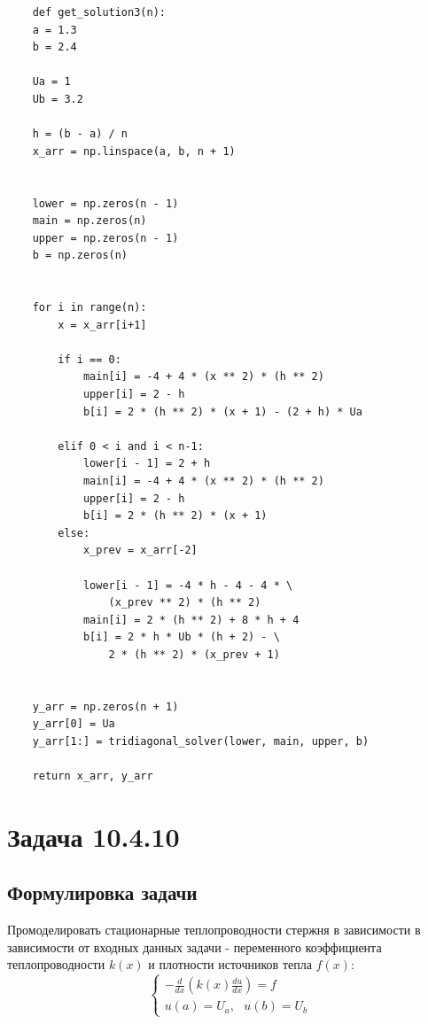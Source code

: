 \documentclass[12pt]{article}%
\begin{document}
\begin{verbatim}
    def get_solution3(n):
    a = 1.3
    b = 2.4

    Ua = 1
    Ub = 3.2

    h = (b - a) / n
    x_arr = np.linspace(a, b, n + 1)


    lower = np.zeros(n - 1)
    main = np.zeros(n)
    upper = np.zeros(n - 1)
    b = np.zeros(n)

    
    for i in range(n):
        x = x_arr[i+1]
    
        if i == 0:
            main[i] = -4 + 4 * (x ** 2) * (h ** 2)
            upper[i] = 2 - h
            b[i] = 2 * (h ** 2) * (x + 1) - (2 + h) * Ua
    
        elif 0 < i and i < n-1:
            lower[i - 1] = 2 + h
            main[i] = -4 + 4 * (x ** 2) * (h ** 2)
            upper[i] = 2 - h
            b[i] = 2 * (h ** 2) * (x + 1)
        else:
            x_prev = x_arr[-2]

            lower[i - 1] = -4 * h - 4 - 4 * \
                (x_prev ** 2) * (h ** 2)
            main[i] = 2 * (h ** 2) + 8 * h + 4
            b[i] = 2 * h * Ub * (h + 2) - \
                2 * (h ** 2) * (x_prev + 1)


    y_arr = np.zeros(n + 1)
    y_arr[0] = Ua
    y_arr[1:] = tridiagonal_solver(lower, main, upper, b)

    return x_arr, y_arr

\end{verbatim}

\newpage
\section{Задача 10.4.10}
\subsection{Формулировка задачи}
Промоделировать стационарные теплопроводности стержня в зависимости в зависимости от входных данных задачи - переменного коэффициента теплопроводности $k(x)$ и плотности источников тепла $f(x)$:
\begin{equation*}
\begin{cases}
    -\frac{d}{dx}\left( k(x) \frac{du}{dx} \right) = f \\
    u(a) = U_a,\ \ \ u(b) = U_b
\end{cases}
\end{equation*}
\end{document}
